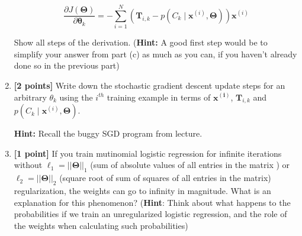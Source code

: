 \documentclass[11pt]{article}
\numberwithin{equation}{section} %
\numberwithin{figure}{section} %
\numberwithin{table}{section} %
\newcommand{\xv}{\mathbf{x}}
\newcommand{\Tv}{\mathbf{T}}
\newcommand{\thetav     }{\boldsymbol \theta     }
\newcommand{\Thetav     }{\boldsymbol \Theta     }
\begin{document}
\begin{enumerate}[label=(\alph*)]
    $$
    \frac{\partial J(\Thetav)}{\partial \thetav_k} = - \sum_{i = 1}^N \left(\Tv_{i, k} - p\left(C_k \mid \xv^{(i)}, \Thetav\right)\right)  \xv^{(i)}
    $$
    
    Show all steps of the derivation. (\textbf{Hint:} A good first step would be to simplify your answer from part (c) as much as you can, if you haven't already done so in the previous part)
    
    
    \begin{solution}
    \bigskip \bigskip \bigskip \bigskip \bigskip \bigskip \bigskip \bigskip
    \bigskip \bigskip \bigskip \bigskip \bigskip \bigskip \bigskip \bigskip
    \bigskip \bigskip \bigskip \bigskip \bigskip \bigskip \bigskip \bigskip
    \bigskip \bigskip \bigskip \bigskip \bigskip \bigskip \bigskip \bigskip
    \bigskip \bigskip \bigskip \bigskip \bigskip \bigskip \bigskip \bigskip
    \bigskip \bigskip \bigskip \bigskip \bigskip \bigskip \bigskip \bigskip
    \end{solution}
    
    \clearpage
    
    \item {\bf [2 points]} Write down the stochastic gradient descent update steps for an arbitrary $\theta_k$ using the $i^{th}$ training example in terms of $\mathbf{x^{(i)}}$, $\Tv_{i, k}$ and $p\left(C_k \mid \xv^{(i)}, \Thetav\right)$. 
    
    \textbf{Hint:} Recall the buggy SGD program from lecture.
    
    \begin{solution}
    \bigskip \bigskip \bigskip \bigskip \bigskip \bigskip \bigskip \bigskip
    \bigskip \bigskip \bigskip \bigskip \bigskip \bigskip \bigskip \bigskip
    
    \end{solution}
    
  
    \item {\bf [1 point]} If you train mutinomial logistic regression for infinite iterations without $\ell_1 = ||\Thetav||_1$ (sum of absolute values of all entries in the matrix ) or $\ell_2=||\Thetav||_2$ (square root of sum of squares of all entries in the matrix) regularization, the weights can go to infinity in magnitude. What is an explanation for this phenomenon? (\textbf{Hint}: Think about what happens to the probabilities if we train an unregularized logistic regression, and the role of the weights when calculating such probabilities)
    

\end{enumerate}
\end{document}
